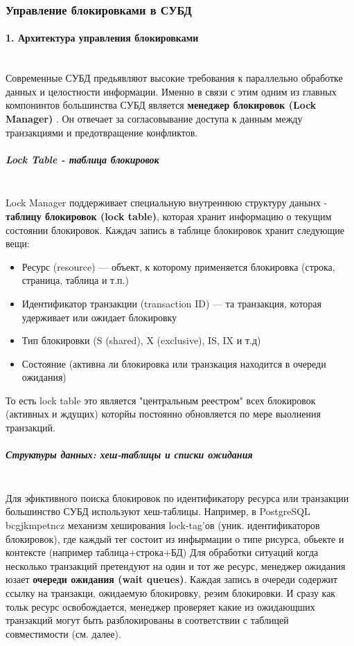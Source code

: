 \subsubsection{Управление блокировками в СУБД}

\paragraph{1. Архитектура управления блокировками} ~\\

Современные СУБД предьявляют высокие требования к параллельно обработке данных и целостности информации. Именно в связи с этим одним из главных компонинтов большинства СУБД является \textbf{менеджер блокировок (Lock Manager)} \autocite{Silberschatz}. Он отвечает за согласовывание доступа к данным между транзакциями и предотвращение конфликтов.

\subparagraph{Lock Table - таблица блокировок} ~\\
 Lock Manager поддерживает специальную внутреннюю структуру данынх - \textbf{таблицу блокировок (lock table)}, которая хранит информацию о текущим состоянии блокировок. Каждач запись в таблице блокировок хранит следующие вещи:
 \begin{itemize}
     \item Ресурс (resource) — объект, к которому применяется блокировка (строка, страница, таблица и т.п.)
     \item Идентификатор транзакции (transaction ID) — та транзакция, которая удерживает или ожидает блокировку
     \item Тип блокировки (S (shared), X (exclusive), IS, IX и т.д)
     \item Состояние (активна ли блокировка или транзкация находится в очереди ожидания)
 \end{itemize}
 То есть lock table это является "центральным реестром" всех блокировок (активных и ждущих) которйы постоянно обновляется по мере выолнения транзакций.

\subparagraph{Структуры данных: хеш-таблицы и списки ожидания} ~\\
 Для эфиктивного поиска блокировок по идентификатору ресурса или транзакции большинство СУБД используют хеш-таблицы. Например, в PostgreSQL bcgjkmpetncz механизм хеширования lock-tag'ов (уник. идентификаторов блокировок), где каждый тег состоит из инфырмации о типе рисурса, обьекте и контексте (например таблица+строка+БД)
 Для обработки ситуаций когда несколько транзакций претендуют на один и тот же ресурс, менеджер ожидания юзает \textbf{очереди ожидания (wait queues)}. Каждая запись в очереди содержит ссылку на транзакци, ожидаемую блокировку, реэим блокировки. И сразу как тольк ресурс освобождается, менеджер проверяет какие из ожидающших транзакций могут быть разблокированы в соответствии с таблицей совместимости (см. далее).

